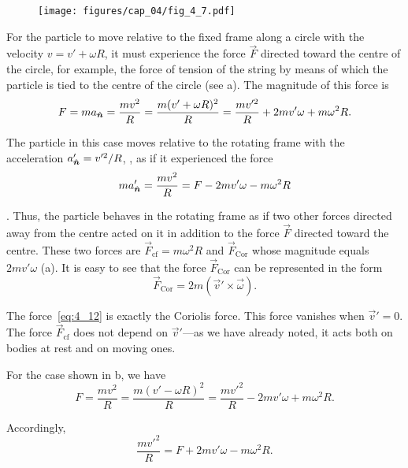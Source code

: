 \begin{figure}[t]
	\begin{center}
		\texttt{[image: figures/cap\_04/fig\_4\_7.pdf]}
		\caption[]{}
		\label{fig:4_7}
	\end{center}
\end{figure}

For the particle to move relative to the fixed frame along a circle with the velocity $v=v'+\omega R$, it must experience the force $\vec{F}$ directed  toward the centre of the circle, for example, the force of tension of the string by means of which the particle is tied to the centre of the circle (see a). The magnitude of this force is
\begin{equation}\label{eq:4_10}
F = m a_{\hat{\boldsymbol{n}}} = \frac{mv^2}{R} = \frac{m(v'+\omega R)^2}{R} = \frac{mv'^2}{R} + 2mv'\omega + m\omega^2 R.
\end{equation}

\noindent
The particle in this case moves relative to the rotating frame with the acceleration $a_{\hat{\boldsymbol{n}}}'=v'^2/R$, \ie, as if it experienced the force
\begin{equation}\label{eq:4_11}
m a_{\hat{\boldsymbol{n}}}' = \frac{mv^2}{R} = F - 2mv'\omega - m\omega^2 R
\end{equation}

. Thus, the particle behaves in the rotating frame as if two other forces directed away from the centre acted on it in addition to the force $\vec{F}$ directed toward the centre. These two forces are $\vec{F}_{\text{cf}}=m\omega^2 R$ and $\vec{F}_{\text{Cor}}$ whose magnitude equals $2mv'\omega$ (a). It is easy to see that the force $\vec{F}_{\text{Cor}}$ can be represented in the form
\begin{equation}\label{eq:4_12}
\vec{F}_{\text{Cor}} = 2m(\vec{v}'\times\vec{\omega}).
\end{equation}

\noindent
The force~\eqref{eq:4_12} is exactly the Coriolis force. This force vanishes when $\vec{v}'=0$. The force $\vec{F}_{\text{cf}}$ does not depend on $\vec{v}'$---as we have already noted, it acts both on bodies at rest and on moving ones.

For the case shown in b, we have
\begin{equation*}
	F = \frac{mv^2}{R} = \frac{m(v'-\omega R)^2}{R} = \frac{mv'^2}{R} - 2mv'\omega + m\omega^2 R.
\end{equation*}

\noindent
Accordingly,
\begin{equation*}
\frac{mv'^2}{R} = F + 2mv'\omega - m\omega^2 R.
\end{equation*}

